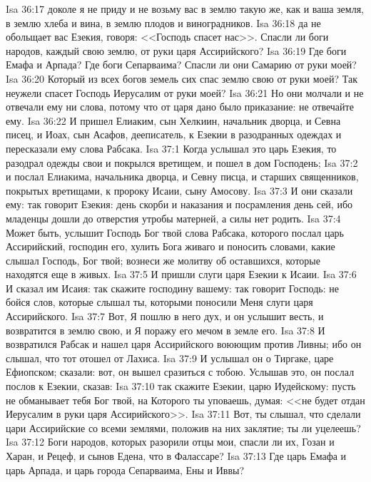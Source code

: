 \vs Isa 36:17 доколе я не приду и не возьму вас в землю такую же, как и ваша земля, в землю хлеба и вина, в землю плодов и виноградников.
\vs Isa 36:18  да не обольщает вас Езекия, говоря: <<Господь спасет нас>>. Спасли ли боги народов, каждый свою землю, от руки царя Ассирийского?
\vs Isa 36:19 Где боги Емафа и Арпада? Где боги Сепарваима? Спасли ли они Самарию от руки моей?
\vs Isa 36:20 Который из всех богов земель сих спас землю свою от руки моей? Так неужели спасет Господь Иерусалим от руки моей?
\vs Isa 36:21 Но они молчали и не отвечали ему ни слова, потому что от царя дано было приказание: не отвечайте ему.
\vs Isa 36:22 И пришел Елиаким, сын Хелкиин, начальник дворца, и Севна писец, и Иоах, сын Асафов, дееписатель, к Езекии в разодранных одеждах и пересказали ему слова Рабсака.
\vs Isa 37:1 Когда услышал это царь Езекия, то разодрал одежды свои и покрылся вретищем, и пошел в дом Господень;
\vs Isa 37:2 и послал Елиакима, начальника дворца, и Севну писца, и старших священников, покрытых вретищами, к пророку Исаии, сыну Амосову.
\vs Isa 37:3 И они сказали ему: так говорит Езекия: день скорби и наказания и посрамления день сей, ибо младенцы дошли до отверстия утробы матерней, а силы нет родить.
\vs Isa 37:4 Может быть, услышит Господь Бог твой слова Рабсака, которого послал царь Ассирийский, господин его, хулить Бога живаго и поносить словами, какие слышал Господь, Бог твой; вознеси же молитву об оставшихся, которые находятся еще в живых.
\rsbpar\vs Isa 37:5 И пришли слуги царя Езекии к Исаии.
\vs Isa 37:6 И сказал им Исаия: так скажите господину вашему: так говорит Господь: не бойся слов, которые слышал ты, которыми поносили Меня слуги царя Ассирийского.
\vs Isa 37:7 Вот, Я пошлю в него дух, и он услышит весть, и возвратится в землю свою, и Я поражу его мечом в земле его.
\rsbpar\vs Isa 37:8 И возвратился Рабсак и нашел царя Ассирийского воюющим против Ливны; ибо он слышал, что тот отошел от Лахиса.
\vs Isa 37:9 И услышал он о Тиргаке, царе Ефиопском;  сказали: вот, он вышел сразиться с тобою. Услышав это, он послал послов к Езекии, сказав:
\vs Isa 37:10 так скажите Езекии, царю Иудейскому: пусть не обманывает тебя Бог твой, на Которого ты уповаешь, думая: <<не будет отдан Иерусалим в руки царя Ассирийского>>.
\vs Isa 37:11 Вот, ты слышал, что сделали цари Ассирийские со всеми землями, положив на них заклятие; ты ли уцелеешь?
\vs Isa 37:12 Боги народов, которых разорили отцы мои, спасли ли их,  Гозан и Харан, и Рецеф, и сынов Едена, что в Фалассаре?
\vs Isa 37:13 Где царь Емафа и царь Арпада, и царь города Сепарваима, Ены и Иввы?

